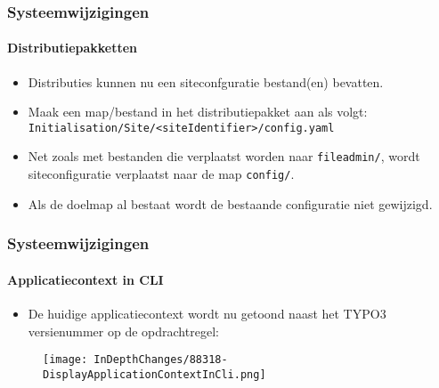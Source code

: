
\begin{frame}[fragile]
	\frametitle{Systeemwijzigingen}
	\framesubtitle{Distributiepakketten}

	\lstset{basicstyle=\tiny\ttfamily}

	\begin{itemize}
		\item Distributies kunnen nu een siteconfguratie bestand(en) bevatten.

		\item Maak een map/bestand in het distributiepakket aan als volgt:\newline
			\texttt{Initialisation/Site/<siteIdentifier>/config.yaml}

		\item Net zoals met bestanden die verplaatst worden naar \texttt{fileadmin/},\newline
			wordt siteconfiguratie verplaatst naar de map \texttt{config/}.

		\item Als de doelmap al bestaat wordt de bestaande configuratie niet gewijzigd.
	\end{itemize}

\end{frame}


\begin{frame}[fragile]
	\frametitle{Systeemwijzigingen}
	\framesubtitle{Applicatiecontext in CLI}

	\begin{itemize}
		\item De huidige applicatiecontext wordt nu getoond naast het
			TYPO3 versienummer op de opdrachtregel:
	\end{itemize}

	\begin{figure}
		\texttt{[image: InDepthChanges/88318-DisplayApplicationContextInCli.png]}
	\end{figure}

\end{frame}


